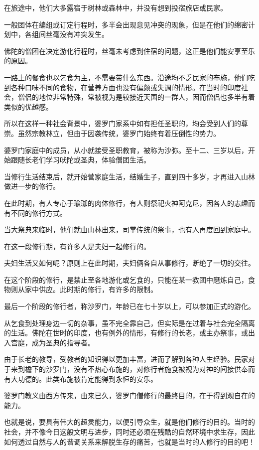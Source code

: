 \documentclass[twoside,openany]{book}
\begin{document}
在旅途中，他们大多露宿于树林或森林中，并没有想到投宿旅店或民家。

一般团体在编组或订定行程时，多半会出现意见冲突的现象，但是在他们的绵密计划中，各组间丝毫没有冲突发生。

佛陀的僧团在决定游化行程时，丝毫未考虑到住宿的问题，这正是他们能安享至乐的原因。

一路上的餐食也以乞食为主，不需要带什么东西。沿途均不乏民家的布施，他们吃到各种口味不同的食物，在营养方面也没有偏颇或失调的情形。在当时的印度社会，僧侣的地位非常特殊，常被视为是较接近天国的一群人，因而僧侣也多半有着类似的优越感。

所以在这样一种社会背景中，婆罗门家系中如有担任圣职的，均会受到人们的尊崇。虽然宗教林立，但由于因袭传统，婆罗门始终有着压倒性的势力。

婆罗门家庭中的成员，从小就接受圣职教育，被称为沙弥。至十二、三岁以后，开始跟随长老们学习吠陀或圣典，体验僧团生活。

当修行生活结束后，就开始营家庭生活，结婚生子，直到四十多岁，才再进入山林做进一步的修行。

在此时期，有人专心于瑜珈的肉体修行，有人则祭祀火神阿克尼，因各人的志趣而有不同的修行方式。

当大祭典来临时，他们就由山林出来，司掌传统的祭事，也有人再度回到家庭中。

在这一段修行期，有许多人是夫妇一起修行的。

夫妇生活又如何呢？原则上在此时期，夫妇俩各自从事修行，断绝了一切的交往。

在这个阶段的修行，是禁止至各地游化或乞食的，只能在某一教团中磨炼自己，食物则从家中供应。此时期的修行，有许多的限制。

最后一个阶段的修行者，称沙罗门，年龄已在七十岁以上，可以参加正式的游化。

从乞食到处理身边一切的杂事，虽不完全靠自己，但实际是在过着与社会完全隔离的生活。佛陀在世时的印度，也有例外的情形，有修行的长老，或主办祭事，或出入宫庭，成为圣典的指导者。

由于长老的教导，受教者的知识得以更加丰富，进而了解到各种人生经验。民家对于来到檐下的沙罗门，没有不热心布施的，对修行者施食被视为对神的间接供奉而有大功德的。此类布施被肯定能得到永恒的安乐。

婆罗门教义由西方传来，由来已久，婆罗门僧修行的最终目的，在于得到观自在的能力。

也就是说，要具有伟大的超灵能力，以便引导众生，就是他们修行的目的。当时的社会，并不像今日这般文明与进步，同时还必须在残酷的自然环境中求生存，因此如何透过自然与人的谐调关系来解脱生存的痛苦，也就是当时的人修行的目的吧！
\end{document}
